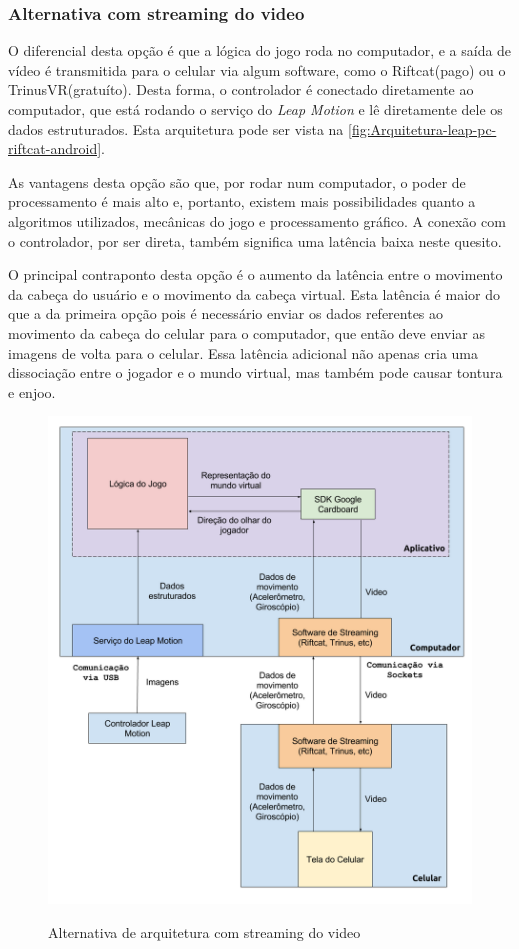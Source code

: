 \subsubsection{Alternativa com streaming do video}\label{subsubsec-arquiteturas-leapmotion-pc-riftcat-android}

O diferencial desta opção é que a lógica do jogo roda no computador, e a saída 
de vídeo é transmitida para o celular via algum software, como o Riftcat(pago) ou
o TrinusVR(gratuíto). Desta forma, o controlador é conectado diretamente 
ao computador, que está rodando o serviço do \textit{Leap Motion} e lê 
diretamente dele os dados estruturados. Esta arquitetura pode ser vista 
na \autoref{fig:Arquitetura-leap-pc-riftcat-android}.

As vantagens desta opção são que, por rodar num computador, o poder de 
processamento é mais alto e, portanto, existem mais possibilidades quanto
a algoritmos utilizados, mecânicas do jogo e processamento gráfico. A conexão 
com o controlador, por ser direta, também significa uma latência baixa 
neste quesito. 

O principal contraponto desta opção é o aumento da latência entre o movimento 
da cabeça do usuário e o movimento da cabeça virtual. Esta latência é maior do 
que a da primeira opção pois é necessário enviar os dados referentes ao movimento 
da cabeça do celular para o computador, que então deve enviar as imagens de 
volta para o celular. Essa latência adicional não apenas cria uma dissociação 
entre o jogador e o mundo virtual, mas também pode causar tontura e enjoo.

\begin{figure}
	\centering
	\caption{Alternativa de arquitetura com streaming do video}
	\includegraphics[width=0.7\linewidth]{images/Arquitetura-leap-pc-riftcat-android}
	\legend{\fonteAP}
	\label{fig:Arquitetura-leap-pc-riftcat-android}
\end{figure}

